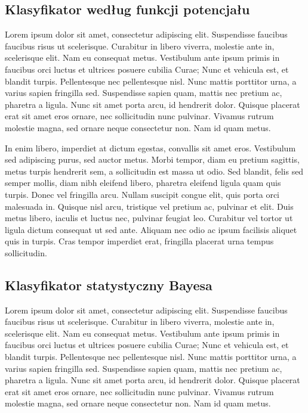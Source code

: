 	\subsection{Klasyfikator według funkcji potencjału}
	Lorem ipsum dolor sit amet, consectetur adipiscing elit. Suspendisse faucibus faucibus risus ut scelerisque. Curabitur in libero viverra, molestie ante in, scelerisque elit. Nam eu consequat metus. Vestibulum ante ipsum primis in faucibus orci luctus et ultrices posuere cubilia Curae; Nunc et vehicula est, et blandit turpis. Pellentesque nec pellentesque nisl. Nunc mattis porttitor urna, a varius sapien fringilla sed. Suspendisse sapien quam, mattis nec pretium ac, pharetra a ligula. Nunc sit amet porta arcu, id hendrerit dolor. Quisque placerat erat sit amet eros ornare, nec sollicitudin nunc pulvinar. Vivamus rutrum molestie magna, sed ornare neque consectetur non. Nam id quam metus.

	In enim libero, imperdiet at dictum egestas, convallis sit amet eros. Vestibulum sed adipiscing purus, sed auctor metus. Morbi tempor, diam eu pretium sagittis, metus turpis hendrerit sem, a sollicitudin est massa ut odio. Sed blandit, felis sed semper mollis, diam nibh eleifend libero, pharetra eleifend ligula quam quis turpis. Donec vel fringilla arcu. Nullam suscipit congue elit, quis porta orci malesuada in. Quisque nisl arcu, tristique vel pretium ac, pulvinar et elit. Duis metus libero, iaculis et luctus nec, pulvinar feugiat leo. Curabitur vel tortor ut ligula dictum consequat ut sed ante. Aliquam nec odio ac ipsum facilisis aliquet quis in turpis. Cras tempor imperdiet erat, fringilla placerat urna tempus sollicitudin.
	
	\subsection{Klasyfikator statystyczny Bayesa}
	Lorem ipsum dolor sit amet, consectetur adipiscing elit. Suspendisse faucibus faucibus risus ut scelerisque. Curabitur in libero viverra, molestie ante in, scelerisque elit. Nam eu consequat metus. Vestibulum ante ipsum primis in faucibus orci luctus et ultrices posuere cubilia Curae; Nunc et vehicula est, et blandit turpis. Pellentesque nec pellentesque nisl. Nunc mattis porttitor urna, a varius sapien fringilla sed. Suspendisse sapien quam, mattis nec pretium ac, pharetra a ligula. Nunc sit amet porta arcu, id hendrerit dolor. Quisque placerat erat sit amet eros ornare, nec sollicitudin nunc pulvinar. Vivamus rutrum molestie magna, sed ornare neque consectetur non. Nam id quam metus.

